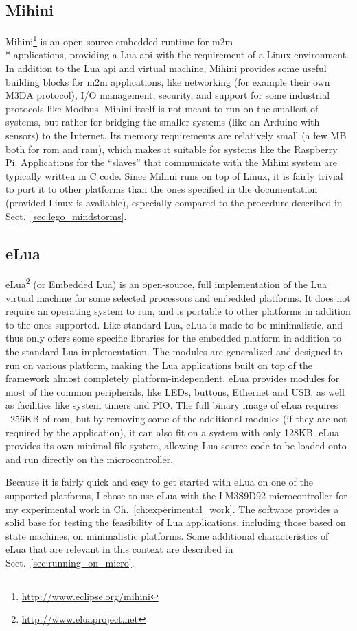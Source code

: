 \subsection{Mihini}
\label{sec:mihini}
Mihini\footnote{\url{http://www.eclipse.org/mihini}} is an open-source embedded runtime for \gls{m2m}\\*-applications, providing a Lua \gls{api} with the requirement of a Linux environment. In addition to the Lua \gls{api} and virtual machine, Mihini provides some useful building blocks for \gls{m2m} applications, like networking (for example their own M3DA protocol), I/O management, security, and support for some industrial protocols like Modbus. Mihini itself is not meant to run on the smallest of systems, but rather for bridging the smaller systems (like an Arduino with sensors) to the Internet. Its memory requirements are relatively small (a few MB both for \gls{rom} and \gls{ram}), which makes it suitable for systems like the Raspberry Pi. Applications for the ``slaves'' that communicate with the Mihini system are typically written in C code. Since Mihini runs on top of Linux, it is fairly trivial to port it to other platforms than the ones specified in the documentation (provided Linux is available), especially compared to the procedure described in Sect.~\ref{sec:lego_mindstorms}.

\subsection{eLua}
\label{sec:elua}
eLua\footnote{\url{http://www.eluaproject.net}} (or Embedded Lua) is an open-source, full implementation of the Lua virtual machine for some selected processors and embedded platforms. It does not require an operating system to run, and is portable to other platforms in addition to the ones supported. Like standard Lua, eLua is made to be minimalistic, and thus only offers some specific libraries for the embedded platform in addition to the standard Lua implementation. The modules are generalized and designed to run on various platform, making the Lua applications built on top of the framework almost completely platform-independent. eLua provides modules for most of the common peripherals, like LEDs, buttons, Ethernet and USB, as well as facilities like system timers and PIO. The full binary image of eLua requires ~256KB of \gls{rom}, but by removing some of the additional modules (if they are not required by the application), it can also fit on a system with only 128KB. eLua provides its own minimal file system, allowing Lua source code to be loaded onto and run directly on the microcontroller.

Because it is fairly quick and easy to get started with eLua on one of the supported platforms, I chose to use eLua with the LM3S9D92 microcontroller for my experimental work in Ch.~\ref{ch:experimental_work}. The software provides a solid base for testing the feasibility of Lua applications, including those based on state machines, on minimalistic platforms. Some additional characteristics of eLua that are relevant in this context are described in Sect.~\ref{sec:running_on_micro}.